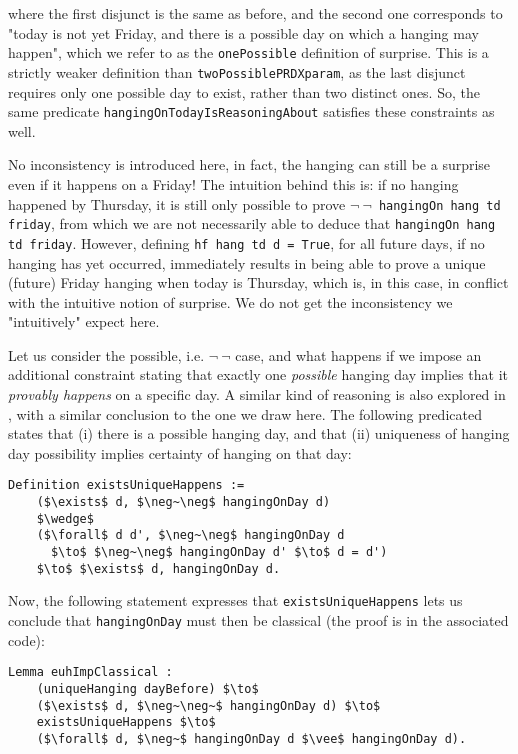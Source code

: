 \documentclass[runningheads]{llncs}
\begin{document}
where the first disjunct is the same as before, and
the second one corresponds to "today is not
  yet Friday, and there is a possible day on which a hanging may happen", which
  we refer to as the {\tt onePossible} definition of surprise. This is a strictly
weaker definition than {\tt twoPossiblePRDXparam}, as the last
disjunct requires only one possible day to exist, rather than two distinct ones.
So, the same predicate {\tt hangingOnTodayIsReasoningAbout} satisfies these
constraints as well.

No inconsistency is introduced here, in fact, the hanging can still be a surprise even if it
happens on a Friday! The intuition behind this is: if no hanging happened by
Thursday, it is still only possible to prove {\tt $\neg~\neg$~hangingOn hang td friday},
from which we are not necessarily able to deduce that {\tt hangingOn hang td friday}.
However, defining {\tt hf hang td d = True}, for all future days, if no hanging has yet occurred,
immediately results in being able to prove a unique (future) Friday hanging when today is Thursday,
which is, in this case, in conflict with the intuitive notion of surprise.
We do not get the inconsistency we "intuitively" expect here.

Let us consider the possible, i.e. $\neg~\neg$ case, and
what happens if we impose an additional constraint stating that
exactly one \emph{possible} hanging
day implies that it \emph{provably happens} on a specific day. A similar kind of reasoning is also explored in
\cite{fourpossible}, with a similar conclusion to the one we draw here. The following
predicated states that (i) there is a possible hanging day, and that (ii) uniqueness of hanging day
possibility implies certainty of hanging on that day:

\begin{lstlisting}[mathescape=true]
  Definition existsUniqueHappens :=
    ($\exists$ d, $\neg~\neg$ hangingOnDay d)
    $\wedge$
    ($\forall$ d d', $\neg~\neg$ hangingOnDay d
      $\to$ $\neg~\neg$ hangingOnDay d' $\to$ d = d')
    $\to$ $\exists$ d, hangingOnDay d.
\end{lstlisting}

Now, the following statement expresses that {\tt existsUniqueHappens} lets us
conclude that {\tt hangingOnDay} must then be classical (the proof is in the
associated code):

\begin{lstlisting}[mathescape=true]
  Lemma euhImpClassical :
    (uniqueHanging dayBefore) $\to$
    ($\exists$ d, $\neg~\neg~$ hangingOnDay d) $\to$
    existsUniqueHappens $\to$
    ($\forall$ d, $\neg~$ hangingOnDay d $\vee$ hangingOnDay d).
\end{lstlisting}
\end{document}
